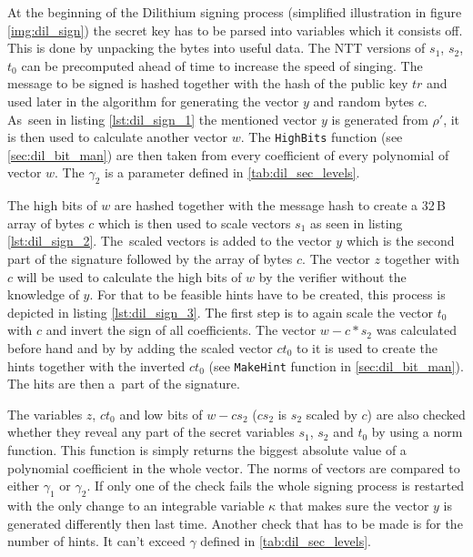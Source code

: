 At the beginning of the Dilithium signing process (simplified illustration in figure \ref{img:dil_sign}) the secret key has to be parsed into variables which it consists off. This is done by unpacking the bytes into useful data. The NTT versions of $s_1$, $s_2$, $t_0$ can be precomputed ahead of time to increase the speed of singing.
\noindent The message to be signed is hashed together with the hash of the public key $tr$ and used later in the algorithm for generating the vector $y$ and random bytes $c$. As~seen in listing \ref{lst:dil_sign_1} the mentioned vector $y$ is generated from $\rho'$, it is then used to calculate another vector $w$. The \texttt{HighBits} function (see \ref{sec:dil_bit_man}) are then taken from every coefficient of every polynomial of vector $w$. The $\gamma_2$ is a parameter defined in \ref{tab:dil_sec_levels}.

The high bits of $w$ are hashed together with the message hash to create a 32\,B array of bytes $c$ which is then used to scale vectors $s_1$ as seen in listing \ref{lst:dil_sign_2}. The~scaled vectors is added to the vector $y$ which is the second part of the signature followed by the array of bytes $c$.
The vector $z$ together with $c$ will be used to calculate the high bits of $w$ by the verifier without the knowledge of $y$. For that to be feasible hints have to be created, this process is depicted in listing \ref{lst:dil_sign_3}. The first step is to again scale the vector $t_0$ with $c$ and invert the sign of all coefficients. The vector $w-c*s_2$ was calculated before hand and by by adding the scaled vector $ct_0$ to it is used to create the hints together with the inverted $ct_0$ (see \texttt{MakeHint} function in \ref{sec:dil_bit_man}). The hits are then a~part of the signature.
\newpage
{}

The variables $z$, $ct_0$ and low bits of $w-cs_2$ ($cs_2$ is $s_2$ scaled by $c$) are also checked whether they reveal any part of the secret variables $s_1$, $s_2$ and $t_0$ by using a norm function. This function is simply returns the biggest absolute value of a polynomial coefficient in the whole vector. The norms of vectors are compared to either $\gamma_1$ or $\gamma_2$. If only one of the check fails the whole signing process is restarted with the only change to an integrable variable $\kappa$ that makes sure the vector $y$ is generated differently then last time. Another check that has to be made is for the number of hints. It can't exceed $\gamma$ defined in \ref{tab:dil_sec_levels}.
